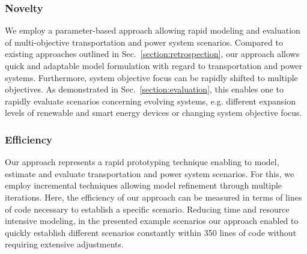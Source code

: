 
\subsubsection*{Novelty}

We employ a parameter-based approach allowing rapid modeling and evaluation of multi-objective transportation and power system scenarios. Compared to existing approaches outlined in Sec.~\ref{section:retrospection}, our approach allows quick and adaptable model formulation with regard to transportation and power systems. Furthermore, system objective focus can be rapidly shifted to multiple objectives. 
As demonstrated in Sec.~\ref{section:evaluation}, this enables one to rapidly evaluate scenarios concerning evolving systems, e.g. different expansion levels of renewable and smart energy devices or changing system objective focus.

\subsubsection*{Efficiency}

Our approach represents a rapid prototyping technique enabling to model, estimate and evaluate transportation and power system scenarios. For this, we employ incremental techniques allowing model refinement through multiple iterations. Here, the efficiency of our approach can be measured in terms of lines of code necessary to establish a specific scenario. Reducing time and resource intensive modeling, in the presented example scenarios our approach enabled to quickly establish different scenarios constantly within 350 lines of code without requiring extensive adjustments. 


